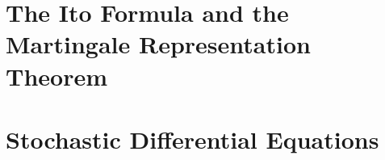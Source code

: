 \documentclass[12pt,a4paper]{article}
\theoremstyle{definition}
\begin{document}
%	
%
%
%
%
%
%
%
%

\newpage
\section{The Ito Formula and the Martingale Representation Theorem} %


\newpage
\section{Stochastic Differential Equations}

 
\newpage
\nocite{*}


\end{document}
